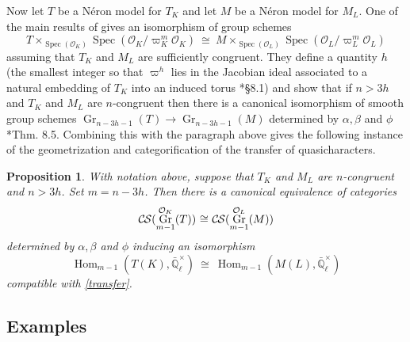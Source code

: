 \documentclass[10pt]{amsart}
\theoremstyle{plain}
\newtheorem{proposition}[theorem]{Proposition}
\theoremstyle{definition}
\newcommand{\EE}{\mathbb{\bar Q}_\ell}
\newcommand{\OK}{\mathcal{O}_K}
\newcommand{\OL}{\mathcal{O}_L}
\newcommand{\EEx}{\EE^\times}
\DeclareMathOperator{\Hom}{Hom}
\DeclareMathOperator{\Gr}{Gr}
\newcommand{\Spec}[1]{{\operatorname{Spec}(#1)}}
\newcommand{\iso}{{\ \cong\ }}
\newcommand{\CS}{{\mathcal{C\hskip-0.8pt S}}}
\begin{document}
Now let $T$ be a N\'eron model for $T_K$ and let $M$ be a N\'eron model for $M_L$.
One of the main results of \cite{chai-yu:01a} gives an isomorphism of group schemes 
\[
T \times_{\Spec{\OK}} \Spec{\OK/\varpi_K^m\OK} \iso M \times_{\Spec{\OL}} \Spec{\OL/\varpi_L^m\OL}
\] 
assuming that $T_K$ and $M_L$ are sufficiently congruent.
They define a quantity $h$ (the smallest integer so that $\varpi^h$ lies in the
Jacobian ideal associated to a natural embedding of $T_K$ into an induced torus \cite{chai-yu:01a}*{\S 8.1}) and show  that if $n > 3h$ and $T_K$ and $M_L$ are $n$-congruent then there is a canonical isomorphism of smooth group schemes
 $
\Gr_{n-3h-1}(T) \to \Gr_{n-3h-1}(M)
 $
 determined by $\alpha, \beta$ and $\phi$ \cite{chai-yu:01a}*{Thm. 8.5}.
Combining this with the paragraph above gives the following instance of the geometrization and categorification of the transfer of quasicharacters.

\begin{proposition}\label{prop:transfer}
 With notation above, suppose that $T_K$ and $M_L$ are $n$-congruent and $n > 3h$.  Set $m = n-3h$.
 Then there is a canonical equivalence of categories
 \[
 \CS(\Gr^{\OK}_{m-1}(T)) \iso \CS(\Gr^{\OL}_{m-1}(M))
 \]
 determined by $\alpha, \beta$ and $\phi$ inducing an isomorphism
 \[
\Hom_{m-1}(T(K), \EEx) \iso  \Hom_{m-1}(M(L), \EEx)
 \]
compatible with \eqref{transfer}.
\end{proposition}


\subsection{Examples}

   
\end{document}
